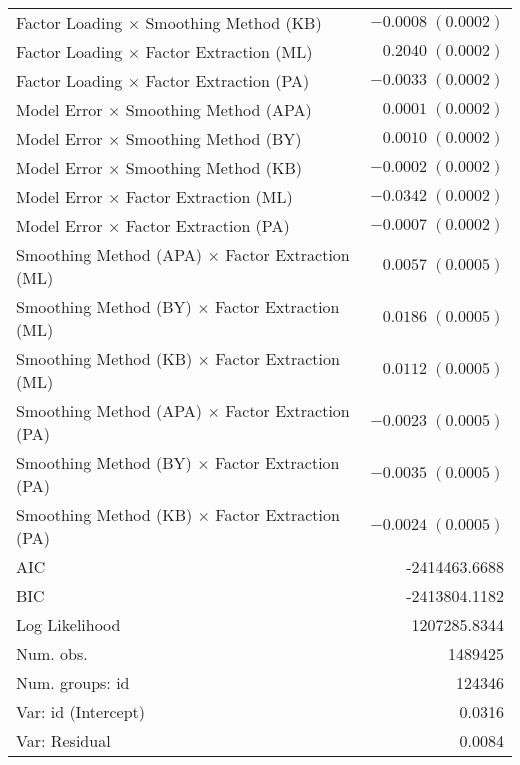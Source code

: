 \documentclass[
  english,
  man]{apa6}
\begin{document}
\begin{center}
\begin{longtable}{l r }
Factor Loading $\times$ Smoothing Method (KB)          & $-0.0008 \; (0.0002)$ \\
Factor Loading $\times$ Factor Extraction (ML)         & $0.2040 \; (0.0002)$  \\
Factor Loading $\times$ Factor Extraction (PA)         & $-0.0033 \; (0.0002)$ \\
Model Error $\times$ Smoothing Method (APA)            & $0.0001 \; (0.0002)$  \\
Model Error $\times$ Smoothing Method (BY)             & $0.0010 \; (0.0002)$  \\
Model Error $\times$ Smoothing Method (KB)             & $-0.0002 \; (0.0002)$ \\
Model Error $\times$ Factor Extraction (ML)            & $-0.0342 \; (0.0002)$ \\
Model Error $\times$ Factor Extraction (PA)            & $-0.0007 \; (0.0002)$ \\
Smoothing Method (APA) $\times$ Factor Extraction (ML) & $0.0057 \; (0.0005)$  \\
Smoothing Method (BY) $\times$ Factor Extraction (ML)  & $0.0186 \; (0.0005)$  \\
Smoothing Method (KB) $\times$ Factor Extraction (ML)  & $0.0112 \; (0.0005)$  \\
Smoothing Method (APA) $\times$ Factor Extraction (PA) & $-0.0023 \; (0.0005)$ \\
Smoothing Method (BY) $\times$ Factor Extraction (PA)  & $-0.0035 \; (0.0005)$ \\
Smoothing Method (KB) $\times$ Factor Extraction (PA)  & $-0.0024 \; (0.0005)$ \\
\hline
AIC                                                    & -2414463.6688         \\
BIC                                                    & -2413804.1182         \\
Log Likelihood                                         & 1207285.8344          \\
Num. obs.                                              & 1489425               \\
Num. groups: id                                        & 124346                \\
Var: id (Intercept)                                    & 0.0316                \\
Var: Residual                                          & 0.0084                \\
\end{longtable}
\end{center}
\end{document}
